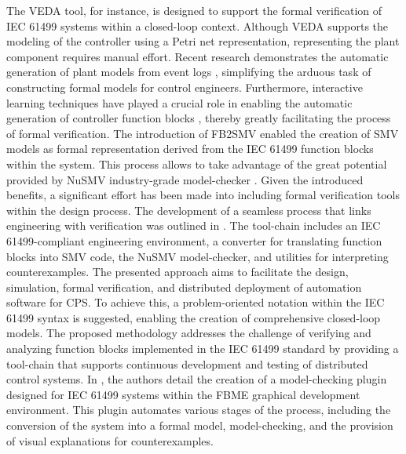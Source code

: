 \documentclass{ieeeojies}
\begin{document}
The VEDA tool, for instance, is designed to support the formal verification of IEC 61499 systems within a closed-loop context. Although VEDA supports the modeling of the controller using a Petri net representation, representing the plant component requires manual effort. 
Recent research demonstrates the automatic generation of plant models from event logs \cite{xavier2022plant, xavier2022process}, simplifying the arduous task of constructing formal models for control engineers. Furthermore, interactive learning techniques have played a crucial role in enabling the automatic generation of controller function blocks \cite{xavier2022interactive}, thereby greatly facilitating the process of formal verification.
The introduction of FB2SMV \cite{fb2smv} enabled the creation of SMV models as formal representation derived from the IEC 61499 function blocks within the system. 
This process allows to take advantage of the great potential provided by NuSMV industry-grade model-checker \cite{Cimatti2002}.
Given the introduced benefits, a significant effort has been made into including formal verification tools within the design process.
The development of a seamless process that links engineering with verification was outlined in \cite{xavier2021}. The tool-chain includes an IEC 61499-compliant engineering environment, a converter for translating function blocks into SMV code, the NuSMV model-checker, and utilities for interpreting counterexamples. The presented approach aims to facilitate the design, simulation, formal verification, and distributed deployment of automation software for CPS. To achieve this, a problem-oriented notation within the IEC 61499 syntax is suggested, enabling the creation of comprehensive closed-loop models. 
The proposed methodology addresses the challenge of verifying and analyzing function blocks implemented in the IEC 61499 standard by providing a tool-chain that supports continuous development and testing of distributed control systems.
In \cite{liakh2022formal}, the authors detail the creation of a model-checking plugin designed for IEC 61499 systems within the FBME \cite{FBME} graphical development environment. This plugin automates various stages of the process, including the conversion of the system into a formal model, model-checking, and the provision of visual explanations for counterexamples.
\end{document}
